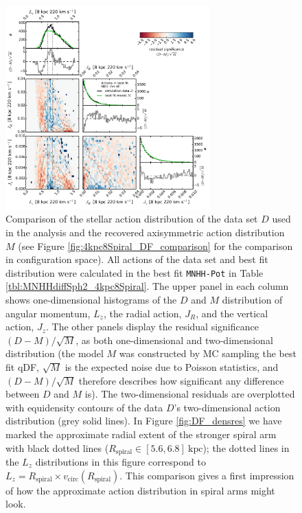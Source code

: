 \documentclass[iop,revtex4,numberedappendix,appendixfloats]{emulateapj}
\begin{document}
\begin{figure}[!htbp]
\centering
\includegraphics[width=0.7\textwidth]{fig/MNdHHdiffSph2_4kpc8Spiral_a_data_bestfit_residuals_only_actions.pdf}
\caption{Comparison of the stellar action distribution of the data set $D$ used in the analysis and the recovered axisymmetric action distribution $M$ (see Figure \ref{fig:4kpc8Spiral_DF_comparison} for the comparison in configuration space). All actions of the data set and best fit distribution were calculated in the best fit \texttt{MNHH-Pot} in Table \ref{tbl:MNHHdiffSph2_4kpc8Spiral}. The upper panel in each column shows one-dimensional histograms of the $D$ and $M$ distribution of angular momentum, $L_z$, the radial action, $J_R$, and the vertical action, $J_z$. The other panels display the residual significance $(D-M)/\sqrt{M}$, as both one-dimensional and two-dimensional distribution (the model $M$ was constructed by MC sampling the best fit qDF, $\sqrt{M}$ is the expected noise due to Poisson statistics, and $(D-M)/\sqrt{M}$ therefore describes how significant any difference between $D$ and $M$ is). The two-dimensional residuals are overplotted with equidensity contours of the data $D$'s two-dimensional action distribution (grey solid lines). In Figure \ref{fig:DF_densres} we have marked the approximate radial extent of the stronger spiral arm with black dotted lines ($R_\text{spiral} \in [5.6,6.8]~\text{kpc}$); the dotted lines in the $L_z$ distributions in this figure correspond to $L_z = R_\text{spiral} \times v_\text{circ}(R_\text{spiral})$. This comparison gives a first impression of how the approximate action distribution in spiral arms might look.}
\label{fig:4kpc8Spiral_actions}
\end{figure}
\end{document}
